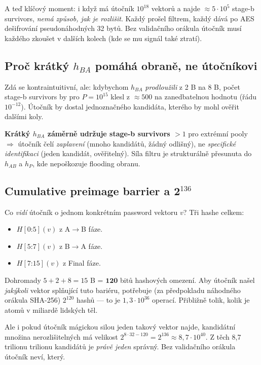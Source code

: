 \documentclass[11pt,a4paper]{article}
\begin{document}
A teď klíčový moment: i když má útočník $10^{18}$ vektorů a najde $\approx 5 \cdot 10^{5}$ stage-b survivors, \emph{nemá způsob, jak je rozlišit}. Každý prošel filtrem, každý dává po AES dešifrování pseudonáhodných 32 bytů. Bez validačního orákula útočník musí každého zkoušet v dalších kolech (kde se mu signál také ztratí).

\subsection{Proč krátký \texorpdfstring{$h_{BA}$}{h\_BA} pomáhá obraně, ne útočníkovi}

Zdá se kontraintuitivní, ale: kdybychom $h_{BA}$ \emph{prodloužili} z 2 B na 8 B, počet stage-b survivors by pro $P = 10^{15}$ klesl z $\approx 500$ na zanedbatelnou hodnotu (řádu $10^{-12}$). Útočník by dostal jednoznačného kandidáta, kterého by mohl ověřit dalšími koly.

\textbf{Krátký $h_{BA}$ záměrně udržuje stage-b survivors $> 1$} pro extrémní pooly $\Rightarrow$ útočník čelí \emph{zaplavení} (mnoho kandidátů, žádný odlišný), ne \emph{specifické identifikaci} (jeden kandidát, ověřitelný). Síla filtru je strukturálně přesunuta do $h_{AB}$ a $h_P$, kde nepoškozuje flooding obranu.

\subsection{Cumulative preimage barrier a 2\texorpdfstring{$^{136}$}{\^136}}

Co \emph{vidí} útočník o jednom konkrétním password vektoru $v$? Tři hashe celkem:
\begin{itemize}[leftmargin=*]
\item $H[0\mathord{:}5](v)$ z A$\to$B fáze.
\item $H[5\mathord{:}7](v)$ z B$\to$A fáze.
\item $H[7\mathord{:}15](v)$ z Final fáze.
\end{itemize}

Dohromady $5 + 2 + 8 = 15$ B = $\boldsymbol{120}$ bitů hashových omezení. Aby útočník našel \emph{jakýkoli} vektor splňující tuto bariéru, potřebuje (za předpokladu náhodného orákula SHA-256) $2^{120}$ hashů --- to je $1{,}3 \cdot 10^{36}$ operací. Přibližně tolik, kolik je atomů v miliardě lidských těl.

Ale i pokud útočník mágickou silou jeden takový vektor najde, kandidátní množina nerozlišitelných má velikost $2^{8 \cdot 32 - 120} = 2^{136} \approx 8{,}7 \cdot 10^{40}$. Z těch 8{,}7 trilionu trilionu kandidátů je \emph{právě jeden} správný. Bez validačního orákula útočník neví, který.
\end{document}
